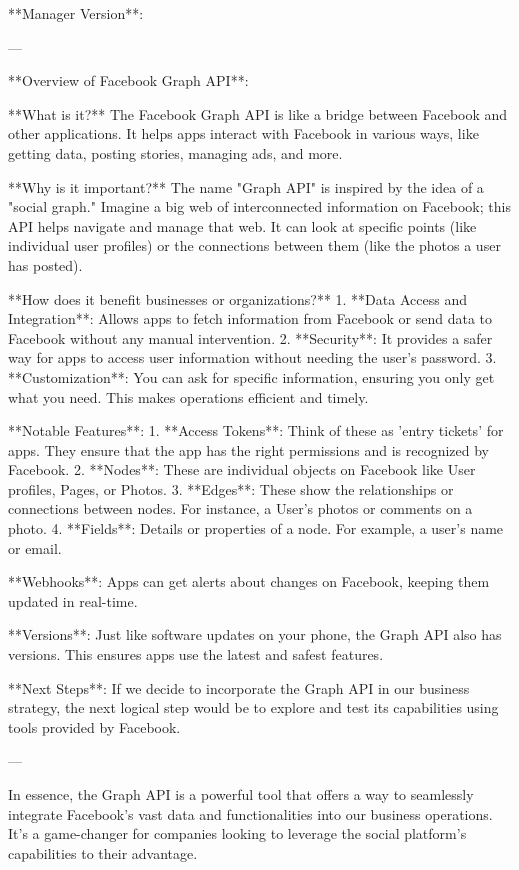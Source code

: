**Manager Version**:

---

**Overview of Facebook Graph API**:

**What is it?**  
The Facebook Graph API is like a bridge between Facebook and other applications. It helps apps interact with Facebook in various ways, like getting data, posting stories, managing ads, and more.

**Why is it important?**  
The name "Graph API" is inspired by the idea of a "social graph." Imagine a big web of interconnected information on Facebook; this API helps navigate and manage that web. It can look at specific points (like individual user profiles) or the connections between them (like the photos a user has posted).

**How does it benefit businesses or organizations?**  
1. **Data Access and Integration**: Allows apps to fetch information from Facebook or send data to Facebook without any manual intervention. 
2. **Security**: It provides a safer way for apps to access user information without needing the user's password.
3. **Customization**: You can ask for specific information, ensuring you only get what you need. This makes operations efficient and timely.

**Notable Features**:
1. **Access Tokens**: Think of these as 'entry tickets' for apps. They ensure that the app has the right permissions and is recognized by Facebook.
2. **Nodes**: These are individual objects on Facebook like User profiles, Pages, or Photos.
3. **Edges**: These show the relationships or connections between nodes. For instance, a User's photos or comments on a photo.
4. **Fields**: Details or properties of a node. For example, a user's name or email.

**Webhooks**: Apps can get alerts about changes on Facebook, keeping them updated in real-time.

**Versions**: Just like software updates on your phone, the Graph API also has versions. This ensures apps use the latest and safest features.

**Next Steps**: If we decide to incorporate the Graph API in our business strategy, the next logical step would be to explore and test its capabilities using tools provided by Facebook.

---

In essence, the Graph API is a powerful tool that offers a way to seamlessly integrate Facebook's vast data and functionalities into our business operations. It's a game-changer for companies looking to leverage the social platform's capabilities to their advantage.
